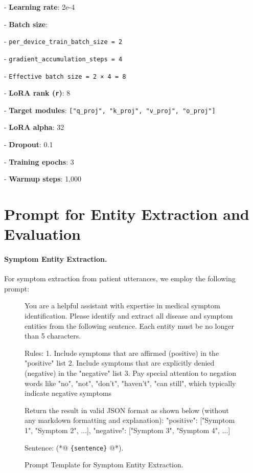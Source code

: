 \documentclass[11pt]{article}
\newcommand{\placeholder}[1]{%
	\colorbox{blue!10}{\texttt{\color{blue!80!black}\{#1\}}}%
}
\begin{document}
\quad- \textbf{Learning rate}: 2e-4 

\quad- \textbf{Batch size}:

\qquad- \texttt{per\_device\_train\_batch\_size = 2}

\qquad- \texttt{gradient\_accumulation\_steps = 4}

\qquad- \texttt{Effective batch size = 2 × 4 = 8}

\quad- \textbf{LoRA rank (\texttt{r})}: 8

\quad- \textbf{Target modules}: \texttt{["q\_proj", "k\_proj", "v\_proj", "o\_proj"]}

\quad- \textbf{LoRA alpha}: 32

\quad- \textbf{Dropout}: 0.1

\quad- \textbf{Training epochs}: 3

\quad- \textbf{Warmup steps}: 1,000

\section{Prompt for Entity Extraction and Evaluation}

\paragraph{Symptom Entity Extraction.}
For symptom extraction from patient utterances, we employ the following prompt:

\begin{figure}[htbp]
	\caption{Prompt Template for Symptom Entity Extraction.}
	\begin{promptlisting}
		You are a helpful assistant with expertise in medical symptom identification.
		Please identify and extract all disease and symptom entities from the following sentence.
		Each entity must be no longer than 5 characters.
		
		Rules:
		1. Include symptoms that are affirmed (positive) in the "positive" list
		2. Include symptoms that are explicitly denied (negative) in the "negative" list
		3. Pay special attention to negation words like "no", "not", "don't", "haven't", "can still", which typically indicate negative symptoms
		
		Return the result in valid JSON format as shown below (without any markdown formatting and explanation):
		{
			"positive": ["Symptom 1", "Symptom 2", ...],
			"negative": ["Symptom 3", "Symptom 4", ...]
		}
		
		Sentence: (*@\placeholder{sentence}@*).
	\end{promptlisting}
	\label{prompt2}
\end{figure}
\end{document}
